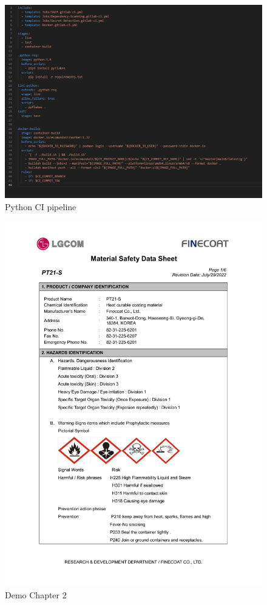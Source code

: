\documentclass[a4paper,12pt,twoside]{report}
\begin{document}
\begin{figure}[H]
		\includegraphics[width=\textwidth, keepaspectratio ]{images/python-yaml}
	\caption[Python CI pipeline]{Python CI pipeline}
\label{Python Pipeline}
\end{figure}	
\begin{figure}[H]
		\includegraphics[width=\textwidth, keepaspectratio]{images/chaps1}
	\caption[Demo Chapter 2 ]{Demo Chapter 2}
\label{chaps1}
\end{figure}
\end{document}

